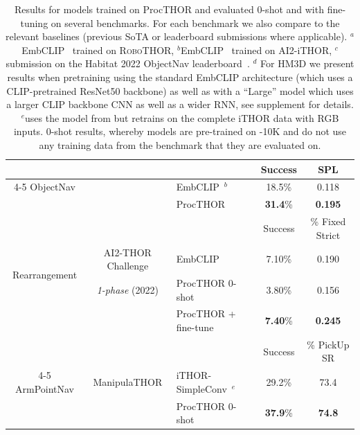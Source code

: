 \begin{table}[h!]
{\begin{tabular}{ cclcc }
        \midrule
        & & & Success & SPL \\
        \cmidrule{4-5}
        ObjectNav & \elienv{} & EmbCLIP~\cite{khandelwal2021simple}$^b$  & 18.5\% & 0.118 \\
        & & ProcTHOR  & \textbf{31.4}\% & \textbf{0.195} \\

        \midrule
        \multirow{4}{*}{Rearrangement} & & & Success & \% Fixed Strict \\
        \cmidrule{4-5}
         & AI2-THOR Challenge & EmbCLIP~\cite{khandelwal2021simple}  & 7.10\% & 0.190 \\
        & \emph{1-phase} (2022) & \cellcolor{Color4}ProcTHOR 0-shot  & \cellcolor{Color4}3.80\% & \cellcolor{Color4}0.156 \\
        & & ProcTHOR + fine-tune  & \textbf{7.40}\% & \textbf{0.245} \\ 
        
        \midrule
        & & & Success & \% PickUp SR \\
        \cmidrule{4-5}
        ArmPointNav & ManipulaTHOR & iTHOR-SimpleConv~\cite{manipulathor}$^e$ & 29.2\% & 73.4 \\
        &  & \cellcolor{Color4}ProcTHOR 0-shot  & \cellcolor{Color4}\textbf{37.9}\% & \cellcolor{Color4}\textbf{74.8} \\
        \bottomrule
    \end{tabular}
    }
    \vspace{0.5em}
    \caption{Results for models trained on ProcTHOR and evaluated 0-shot and with fine-tuning on several \eai benchmarks. For each benchmark we also compare to the relevant baselines (previous SoTA or leaderboard submissions where applicable). $^a$EmbCLIP~\cite{khandelwal2021simple} trained on \textsc{RoboTHOR}, $^b$EmbCLIP~\cite{khandelwal2021simple} trained on AI2-iTHOR, $^c$submission on the Habitat 2022 ObjectNav leaderboard~\cite{habitat-challenge}. $^d$ For HM3D we present results when pretraining using the standard EmbCLIP architecture (which uses a CLIP-pretrained ResNet50 backbone) as well as with a ``Large'' model which uses a larger CLIP backbone CNN as well as a wider RNN, see supplement for details.
    $^e$uses the model from \cite{manipulathor} but retrains on the complete iTHOR data with RGB inputs. \crule[Color4]{5mm}{2.5mm} 0-shot results, whereby models are pre-trained on \env{}-10K and do not use any training data from the benchmark that they are evaluated on.}
    \label{tab:allresults}
\end{table}